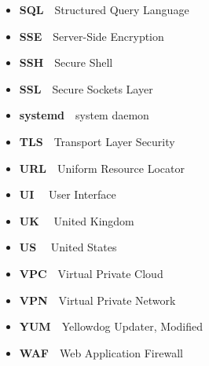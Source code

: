 \begin{itemize}
    \item  \textbf{SQL}~\textemdash~Structured Query Language
    \item  \textbf{SSE}~\textemdash~Server-Side Encryption
    \item  \textbf{SSH}~\textemdash~Secure Shell
    \item  \textbf{SSL}~\textemdash~Secure Sockets Layer
    \item  \textbf{systemd}~\textemdash~system daemon
    \item  \textbf{TLS}~\textemdash~Transport Layer Security
    \item  \textbf{URL}~\textemdash~Uniform Resource Locator
    \item  \textbf{UI} ~\textemdash~User Interface
    \item  \textbf{UK} ~\textemdash~United Kingdom
    \item  \textbf{US} ~\textemdash~United States
    \item  \textbf{VPC}~\textemdash~Virtual Private Cloud
    \item  \textbf{VPN}~\textemdash~Virtual Private Network
    \item  \textbf{YUM}~\textemdash~Yellowdog Updater, Modified
    \item  \textbf{WAF}~\textemdash~Web Application Firewall
\end{itemize}

\afterpreface \afterabstract
